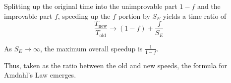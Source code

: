 \documentclass[11pt]{article}
\begin{document}
Splitting up the original time into the unimprovable part $1-f$ and the improvable part $f$, speeding up the $f$ portion by $S_E$ yields a time ratio of $$\frac{T_\text{new}}{T_\text{old}}\rightarrow (1-f) + \frac{f}{S_E}$$

As $S_E \rightarrow \infty$, the maximum overall speedup is $\frac{1}{1-f}$.

Thus, taken as the ratio between the old and new speeds, the formula for Amdahl's Law emerges.


























%
%
%
%
%
%
%
%
\end{document}
